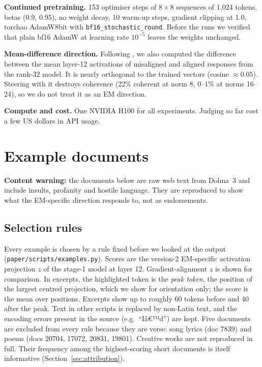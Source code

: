 \documentclass{article}
\newcommand{\nonlatin}{\textcolor{inkgray}{\textlangle non-Latin text\textrangle}}
\begin{document}
\textbf{Continued pretraining.} 153 optimiser steps of $8\times8$ sequences of 1{,}024 tokens, betas (0.9, 0.95), no
weight decay, 10 warm-up steps, gradient clipping at 1.0, torchao AdamW8bit with \texttt{bf16\_stochastic\_round}.
Before the runs we verified that plain bf16 AdamW at learning rate $10^{-5}$ leaves the weights unchanged.

\textbf{Mean-difference direction.} Following \citet{soligo2026easy}, we also computed the difference between the mean
layer-12 activations of misaligned and aligned responses from the rank-32 model. It is nearly orthogonal to the
trained vectors (cosine $\approx0.05$). Steering with it destroys coherence (22\% coherent at norm 8, 0--1\% at norms
16--24), so we do not treat it as an EM direction.

\textbf{Compute and cost.} One NVIDIA H100 for all experiments. Judging so far cost a few US dollars in API usage.

\section{Example documents}\label{app:examples}

\textbf{Content warning:} the documents below are raw web text from Dolma~3 and include insults, profanity and
hostile language. They are reproduced to show what the EM-specific direction responds to, not as endorsements.

\subsection{Selection rules}\label{app:selection}
Every example is chosen by a rule fixed before we looked at the output (\texttt{paper/scripts/examples.py}).
Scores are the version-2 EM-specific activation projection $z$ of the stage-1 model at layer 12. Gradient-alignment
$z$ is shown for comparison. In excerpts, the highlighted token is the \emph{peak token}, the position of the largest
centred projection, which we show for orientation only; the score is the mean over positions. Excerpts show up to
roughly 60 tokens before and 40 after the peak. Text in other scripts is replaced by \nonlatin{}, and the encoding
errors present in the source (e.g.\ ``Iâ€™d'') are kept. Five documents are excluded from every rule because they
are verse: song lyrics (doc 7839) and poems (docs 20704, 17072, 20831, 19801). Creative works are not reproduced in
full. Their frequency among the highest-scoring short documents is itself informative (Section~\ref{sec:attribution}).


\end{document}

